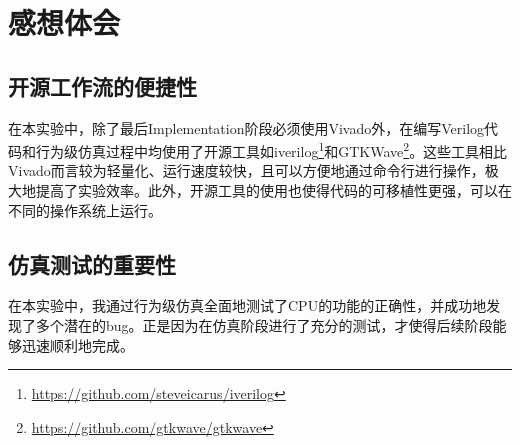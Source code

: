 \section{感想体会}

\subsection{开源工作流的便捷性}
在本实验中，除了最后Implementation阶段必须使用Vivado外，在编写Verilog代码和行为级仿真过程中均使用了开源工具如iverilog\footnote{\href{https://github.com/steveicarus/iverilog}{https://github.com/steveicarus/iverilog}}和GTKWave\footnote{\href{https://github.com/gtkwave/gtkwave}{https://github.com/gtkwave/gtkwave}}。这些工具相比Vivado而言较为轻量化、运行速度较快，且可以方便地通过命令行进行操作，极大地提高了实验效率。此外，开源工具的使用也使得代码的可移植性更强，可以在不同的操作系统上运行。

\subsection{仿真测试的重要性}
在本实验中，我通过行为级仿真全面地测试了CPU的功能的正确性，并成功地发现了多个潜在的bug。正是因为在仿真阶段进行了充分的测试，才使得后续阶段能够迅速顺利地完成。
